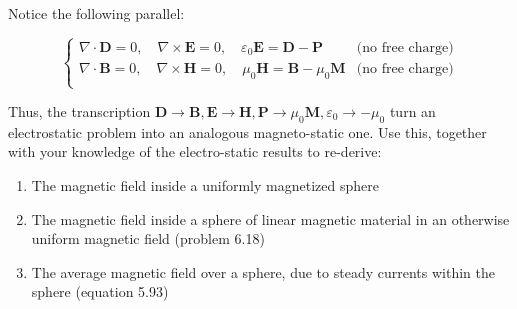 \documentclass{homework}
\newcommand\ve{\varepsilon}
\newcommand{\bs}[1]{\ensuremath{\boldsymbol{#1}}}
\begin{document}
\begin{homeworkProblem}[Problem 6.25]

  Notice the following parallel:

  $$
  \begin{cases}
    \nabla \cdot \bs{D} = 0, \quad\nabla \times \bs{E} = 0, \quad \ve_0 \bs{E} = \bs{D} - \bs{P} &\text{(no free charge)} \\
    \nabla \cdot \bs{B} = 0, \quad \nabla \times \bs{H} = 0, \quad \mu_0 \bs{H} = \bs{B} - \mu_0 \bs{M} &\text{(no free charge)} \\
  \end{cases}
  $$

  Thus, the transcription $\bs{D} \rightarrow \bs{B}, \bs{E} \rightarrow \bs{H}, \bs{P} \rightarrow \mu_0 \bs{M}, \ve_0 \rightarrow -\mu_0$ turn an electrostatic problem into an analogous magneto-static one. Use this, together with your knowledge of the electro-static results to re-derive:

  \begin{enumerate}
    \item The magnetic field inside a uniformly magnetized sphere
    \item The magnetic field inside a sphere of linear magnetic material in an otherwise uniform magnetic field (problem 6.18)
    \item The average magnetic field over a sphere, due to steady currents within the sphere (equation 5.93)
  \end{enumerate}

  \vspace{.2in}

  \problemAnswer{ %

}
\end{homeworkProblem}
\end{document}
